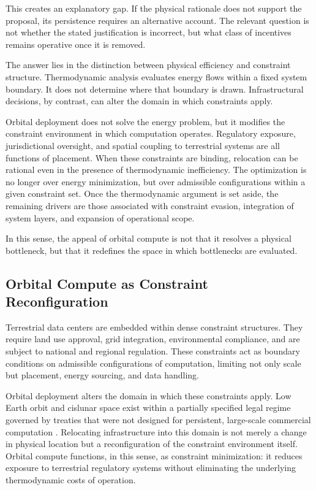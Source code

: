 \documentclass[11pt,a4paper]{article}
\theoremstyle{plain}
\theoremstyle{definition}
\theoremstyle{remark}
\begin{document}
This creates an explanatory gap. If the physical rationale does not support the
proposal, its persistence requires an alternative account. The relevant question
is not whether the stated justification is incorrect, but what class of
incentives remains operative once it is removed.

The answer lies in the distinction between physical efficiency and constraint
structure. Thermodynamic analysis evaluates energy flows within a fixed system
boundary. It does not determine where that boundary is drawn. Infrastructural
decisions, by contrast, can alter the domain in which constraints apply.

Orbital deployment does not solve the energy problem, but it modifies the
constraint environment in which computation operates. Regulatory exposure,
jurisdictional oversight, and spatial coupling to terrestrial systems are all
functions of placement. When these constraints are binding, relocation can be
rational even in the presence of thermodynamic inefficiency. The optimization is
no longer over energy minimization, but over admissible configurations within a
given constraint set. Once the thermodynamic argument is set aside, the remaining
drivers are those associated with constraint evasion, integration of system
layers, and expansion of operational scope.

In this sense, the appeal of orbital compute is not that it resolves a physical
bottleneck, but that it redefines the space in which bottlenecks are evaluated.

\subsection{Orbital Compute as Constraint Reconfiguration}

Terrestrial data centers are embedded within dense constraint structures. They
require land use approval, grid integration, environmental compliance, and are
subject to national and regional regulation. These constraints act as boundary
conditions on admissible configurations of computation, limiting not only scale
but placement, energy sourcing, and data handling.

Orbital deployment alters the domain in which these constraints apply. Low Earth
orbit and cislunar space exist within a partially specified legal regime governed
by treaties that were not designed for persistent, large-scale commercial
computation \citep{wertz2011}. Relocating infrastructure into this domain is not
merely a change in physical location but a reconfiguration of the constraint
environment itself. Orbital compute functions, in this sense, as constraint
minimization: it reduces exposure to terrestrial regulatory systems without
eliminating the underlying thermodynamic costs of operation.
\end{document}
